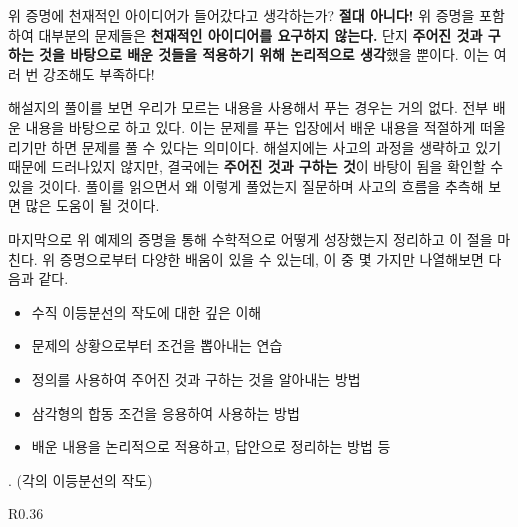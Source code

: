 위 증명에 천재적인 아이디어가 들어갔다고 생각하는가? \textbf{절대 아니다!} 위 증명을 포함하여 대부분의 문제들은 \textbf{천재적인 아이디어를 요구하지 않는다.} 단지 \textbf{주어진 것과 구하는 것을 바탕으로 배운 것들을 적용하기 위해 논리적으로 생각}했을 뿐이다. 이는 여러 번 강조해도 부족하다!

해설지의 풀이를 보면 우리가 모르는 내용을 사용해서 푸는 경우는 거의 없다. 전부 배운 내용을 바탕으로 하고 있다. 이는 문제를 푸는 입장에서 배운 내용을 적절하게 떠올리기만 하면 문제를 풀 수 있다는 의미이다. 해설지에는 사고의 과정을 생략하고 있기 때문에 드러나있지 않지만, 결국에는 \textbf{주어진 것과 구하는 것}이 바탕이 됨을 확인할 수 있을 것이다. 풀이를 읽으면서 왜 이렇게 풀었는지 질문하며 사고의 흐름을 추측해 보면 많은 도움이 될 것이다.

마지막으로 위 예제의 증명을 통해 수학적으로 어떻게 성장했는지 정리하고 이 절을 마친다. 위 증명으로부터 다양한 배움이 있을 수 있는데, 이 중 몇 가지만 나열해보면 다음과 같다.
\begin{itemize}
    \item 수직 이등분선의 작도에 대한 깊은 이해
    \item 문제의 상황으로부터 조건을 뽑아내는 연습
    \item 정의를 사용하여 주어진 것과 구하는 것을 알아내는 방법
    \item 삼각형의 합동 조건을 응용하여 사용하는 방법
    \item 배운 내용을 논리적으로 적용하고, 답안으로 정리하는 방법 등
\end{itemize}

\bigskip

\ex. (각의 이등분선의 작도)

\begin{wrapfigure}{R}{0.36\textwidth}
    \vspace*{-50px}
\end{wrapfigure}

